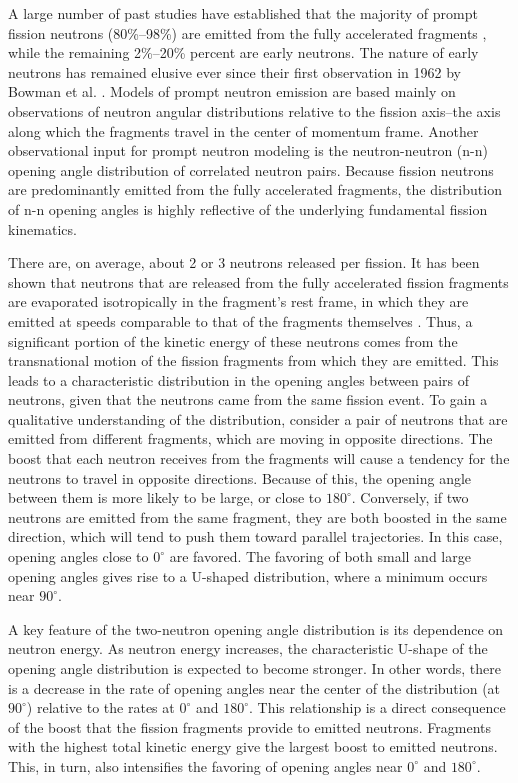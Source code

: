 A large number of past studies have established that the majority of prompt fission neutrons (80\%--98\%) are emitted from the fully accelerated fragments \cite{Scission2005}, while the remaining 2\%--20\% percent are early neutrons.  The nature of early neutrons has remained elusive ever since their first observation in 1962 by Bowman et al. \cite{Bowman}. Models of prompt neutron emission are based mainly on observations of neutron angular distributions relative to the fission axis--the axis along which the fragments travel in the center of momentum frame. Another observational input for prompt neutron modeling is the neutron-neutron (n-n) opening angle distribution of correlated neutron pairs. Because fission neutrons are predominantly emitted from the fully accelerated fragments, the distribution of n-n opening angles is highly reflective of the underlying fundamental fission kinematics.

There are, on average, about 2 or 3 neutrons released per fission. It has been shown that neutrons that are released from the fully accelerated fission fragments are evaporated isotropically in the fragment's rest frame, in which they are emitted at speeds comparable to that of the fragments themselves \cite{fragmentRestFrame}. Thus, a significant portion of the kinetic energy of these neutrons comes from the transnational motion of the fission fragments from which they are emitted. This leads to a characteristic distribution in the opening angles between pairs of neutrons, given that the neutrons came from the same fission event. 
To gain a qualitative understanding of the distribution, consider a pair of neutrons that are emitted from different fragments, which are moving in opposite directions. The boost that each neutron receives from the fragments will cause a tendency for the neutrons to travel in opposite directions. Because of this, the opening angle between them is more likely to be large, or close to $180^{\circ}$. Conversely, if two neutrons are emitted from the same fragment, they are both boosted in the same direction, which will tend to push them toward parallel trajectories. In this case, opening angles close to $0^{\circ}$ are favored. The favoring of both small and large opening angles gives rise to a U-shaped distribution, where a minimum occurs near $90^{\circ}$. 

A key feature of the two-neutron opening angle distribution is its dependence on neutron energy. As neutron energy increases, the characteristic U-shape of the opening angle distribution is expected to become stronger. In other words, there is a decrease in the rate of opening angles near the center of the distribution (at $90^{\circ}$) relative to the rates at $0^{\circ}$ and $180^{\circ}$. This relationship is a direct consequence of the boost that the fission fragments provide to emitted neutrons. Fragments with the highest total kinetic energy give the largest boost to emitted neutrons. This, in turn, also intensifies the favoring of opening angles near $0^{\circ}$ and $180^{\circ}$. 

